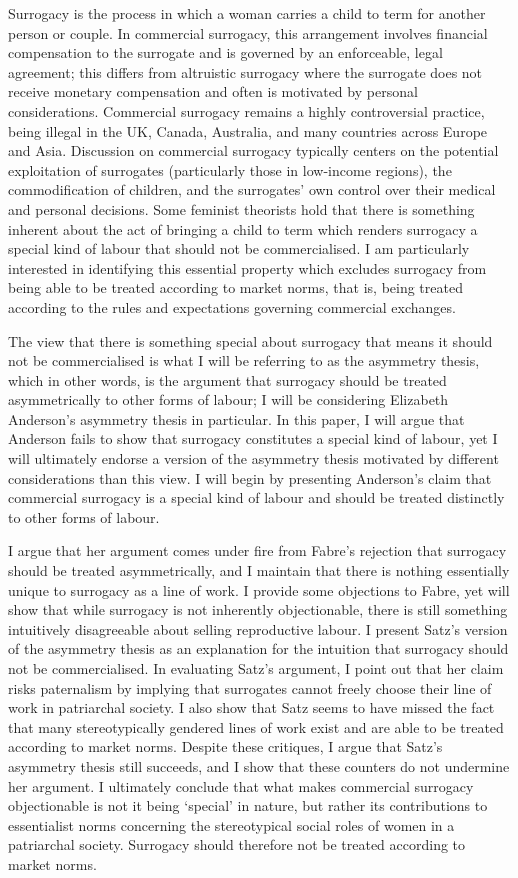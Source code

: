 Surrogacy is
the process in which a woman carries a child to term for another person
or couple. In commercial surrogacy, this arrangement involves financial
compensation to the surrogate and is governed by an enforceable, legal
agreement; this differs from altruistic surrogacy where the surrogate
does not receive monetary compensation and often is motivated by
personal considerations. Commercial surrogacy remains a highly
controversial practice, being illegal in the UK, Canada, Australia, and
many countries across Europe and Asia. Discussion on commercial
surrogacy typically centers on the potential exploitation of surrogates
(particularly those in low-income regions), the commodification of
children, and the surrogates' own control over their medical and
personal decisions. Some feminist theorists hold that there is something
inherent about the act of bringing a child to term which renders
surrogacy a special kind of labour that should not be commercialised. I
am particularly interested in identifying this essential property which
excludes surrogacy from being able to be treated according to market
norms, that is, being treated according to the rules and expectations
governing commercial exchanges. 

The view that there is something special
about surrogacy that means it should not be commercialised is what I
will be referring to as the asymmetry thesis, which in other words, is
the argument that surrogacy should be treated asymmetrically to other
forms of labour; I will be considering Elizabeth Anderson's asymmetry
thesis in particular. In this paper, I will argue that Anderson fails to
show that surrogacy constitutes a special kind of labour, yet I will
ultimately endorse a version of the asymmetry thesis motivated by
different considerations than this view. I will begin by presenting
Anderson's claim that commercial surrogacy is a special kind of labour
and should be treated distinctly to other forms of labour. 

I argue
that her argument comes under fire from Fabre's rejection that surrogacy
should be treated asymmetrically, and I maintain that there is nothing
essentially unique to surrogacy as a line of work. I provide some
objections to Fabre, yet will show that while surrogacy is not
inherently objectionable, there is still something intuitively
disagreeable about selling reproductive labour. I present Satz's version
of the asymmetry thesis as an explanation for the intuition that
surrogacy should not be commercialised. In evaluating Satz's argument, I
point out that her claim risks paternalism by implying that surrogates
cannot freely choose their line of work in patriarchal society. I also
show that Satz seems to have missed the fact that many stereotypically
gendered lines of work exist and are able to be treated according to
market norms. Despite these critiques, I argue that Satz's asymmetry
thesis still succeeds, and I show that these counters do not undermine
her argument. I ultimately conclude that what makes commercial surrogacy
objectionable is not it being `special' in nature, but rather its
contributions to essentialist norms concerning the stereotypical social
roles of women in a patriarchal society. Surrogacy should therefore not
be treated according to market norms. 

